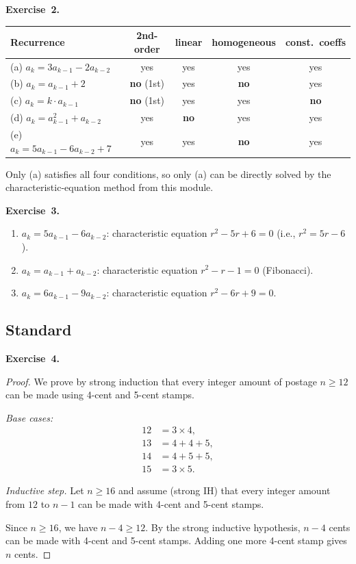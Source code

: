 \documentclass[11pt]{article}
\begin{document}
\medskip
\textbf{Exercise~2.}
\begin{center}
\begin{tabular}{l|cccc}
\toprule
Recurrence & 2nd-order & linear & homogeneous & const.\ coeffs \\
\midrule
(a) $a_k = 3 a_{k-1} - 2 a_{k-2}$ & yes & yes & yes & yes \\
(b) $a_k = a_{k-1} + 2$ & \textbf{no} (1st) & yes & \textbf{no} & yes \\
(c) $a_k = k \cdot a_{k-1}$ & \textbf{no} (1st) & yes & yes & \textbf{no} \\
(d) $a_k = a_{k-1}^2 + a_{k-2}$ & yes & \textbf{no} & yes & yes \\
(e) $a_k = 5 a_{k-1} - 6 a_{k-2} + 7$ & yes & yes & \textbf{no} & yes \\
\bottomrule
\end{tabular}
\end{center}
Only (a) satisfies all four conditions, so only (a) can be directly solved by the characteristic-equation method from this module.

\medskip
\textbf{Exercise~3.}
\begin{enumerate}[label=(\alph*)]
  \item $a_k = 5 a_{k-1} - 6 a_{k-2}$: characteristic equation $r^2 - 5r + 6 = 0$ (i.e., $r^2 = 5r - 6$).
  \item $a_k = a_{k-1} + a_{k-2}$: characteristic equation $r^2 - r - 1 = 0$ (Fibonacci).
  \item $a_k = 6 a_{k-1} - 9 a_{k-2}$: characteristic equation $r^2 - 6r + 9 = 0$.
\end{enumerate}

\subsection*{Standard}

\textbf{Exercise~4.}
\begin{proof}
We prove by strong induction that every integer amount of postage
$n \geq 12$ can be made using 4-cent and 5-cent stamps.

\emph{Base cases:}
\begin{align*}
  12 &= 3 \times 4, \\
  13 &= 4 + 4 + 5, \\
  14 &= 4 + 5 + 5, \\
  15 &= 3 \times 5.
\end{align*}

\emph{Inductive step.} Let $n \geq 16$ and assume (strong IH) that every
integer amount from $12$ to $n - 1$ can be made with 4-cent and 5-cent stamps.

Since $n \geq 16$, we have $n - 4 \geq 12$. By the strong inductive
hypothesis, $n - 4$ cents can be made with 4-cent and 5-cent stamps. Adding
one more 4-cent stamp gives $n$ cents.
\end{proof}
\end{document}
